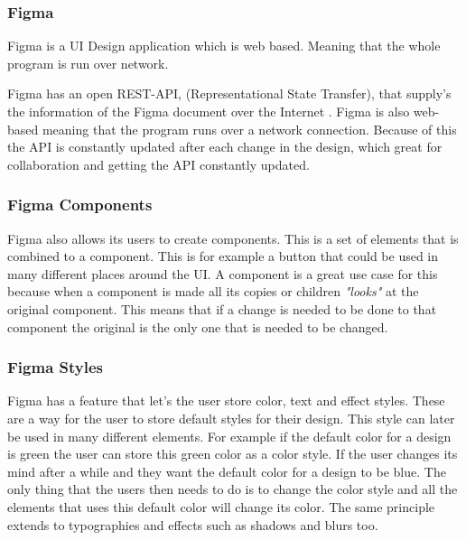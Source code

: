  






\subsubsection{Figma}%
\label{sub:Figma}
Figma is a UI Design application which is web based. Meaning that the whole program is run over network. 

Figma has an open REST-API, (Representational State Transfer), that supply's the information of the Figma document over the Internet \cite{figmaFigma, RepresentationalStateTransfer2021}. Figma is also web-based meaning that the program runs over a network connection. Because of this the API is constantly updated after each change in the design, which great for collaboration and getting the API constantly updated.

\subsubsection{Figma Components}%
\label{ssub:Figma Components}

Figma also allows its users to create components. This is a set of elements that is combined to a component. This is for example a button that could be used in many different places around the UI. A component is a great use case for this because when a component is made all its copies or children \textit{"looks"} at the original component. This means that if a change is needed to be done to that component the original is the only one that is needed to be changed.

\subsubsection{Figma Styles}%
\label{ssub:Styles}
Figma has a feature that let's the user store color, text and effect styles. These are a way for the user to store default styles for their design. This style can later be used in many different elements. For example if the default color for a design is green the user can store this green color as a color style. If the user changes its mind after a while and they want the default color for a design to be blue. The only thing that the users then needs to do is to change the color style and all the elements that uses this default color will change its color. The same principle extends to typographies and effects such as shadows and blurs too. 





